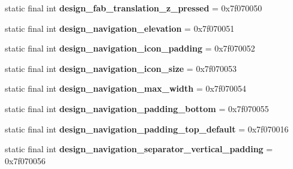 \begin{DoxyCompactItemize}
\item 
\hypertarget{classandroid_1_1support_1_1design_1_1_r_1_1dimen_a51c58f3bb12ba528b250d93588890122}{}static final int {\bfseries design\+\_\+fab\+\_\+translation\+\_\+z\+\_\+pressed} = 0x7f070050\label{classandroid_1_1support_1_1design_1_1_r_1_1dimen_a51c58f3bb12ba528b250d93588890122}

\item 
\hypertarget{classandroid_1_1support_1_1design_1_1_r_1_1dimen_aefa62bedc2505b09d491e969011487c7}{}static final int {\bfseries design\+\_\+navigation\+\_\+elevation} = 0x7f070051\label{classandroid_1_1support_1_1design_1_1_r_1_1dimen_aefa62bedc2505b09d491e969011487c7}

\item 
\hypertarget{classandroid_1_1support_1_1design_1_1_r_1_1dimen_ae84d41ce904136aaafbbd73e8d23ed55}{}static final int {\bfseries design\+\_\+navigation\+\_\+icon\+\_\+padding} = 0x7f070052\label{classandroid_1_1support_1_1design_1_1_r_1_1dimen_ae84d41ce904136aaafbbd73e8d23ed55}

\item 
\hypertarget{classandroid_1_1support_1_1design_1_1_r_1_1dimen_a09a0e74d4044391a347f715900c8ba05}{}static final int {\bfseries design\+\_\+navigation\+\_\+icon\+\_\+size} = 0x7f070053\label{classandroid_1_1support_1_1design_1_1_r_1_1dimen_a09a0e74d4044391a347f715900c8ba05}

\item 
\hypertarget{classandroid_1_1support_1_1design_1_1_r_1_1dimen_aea61310378807a0bf7cf2f2a8a494681}{}static final int {\bfseries design\+\_\+navigation\+\_\+max\+\_\+width} = 0x7f070054\label{classandroid_1_1support_1_1design_1_1_r_1_1dimen_aea61310378807a0bf7cf2f2a8a494681}

\item 
\hypertarget{classandroid_1_1support_1_1design_1_1_r_1_1dimen_a2647e9da0be00a73db532944c5288a3a}{}static final int {\bfseries design\+\_\+navigation\+\_\+padding\+\_\+bottom} = 0x7f070055\label{classandroid_1_1support_1_1design_1_1_r_1_1dimen_a2647e9da0be00a73db532944c5288a3a}

\item 
\hypertarget{classandroid_1_1support_1_1design_1_1_r_1_1dimen_a70d368b727ec0c602d584cc5b8a8364d}{}static final int {\bfseries design\+\_\+navigation\+\_\+padding\+\_\+top\+\_\+default} = 0x7f070016\label{classandroid_1_1support_1_1design_1_1_r_1_1dimen_a70d368b727ec0c602d584cc5b8a8364d}

\item 
\hypertarget{classandroid_1_1support_1_1design_1_1_r_1_1dimen_ad6a3bb1231788391e52c4896d0de39f7}{}static final int {\bfseries design\+\_\+navigation\+\_\+separator\+\_\+vertical\+\_\+padding} = 0x7f070056\label{classandroid_1_1support_1_1design_1_1_r_1_1dimen_ad6a3bb1231788391e52c4896d0de39f7}


\end{DoxyCompactItemize}
